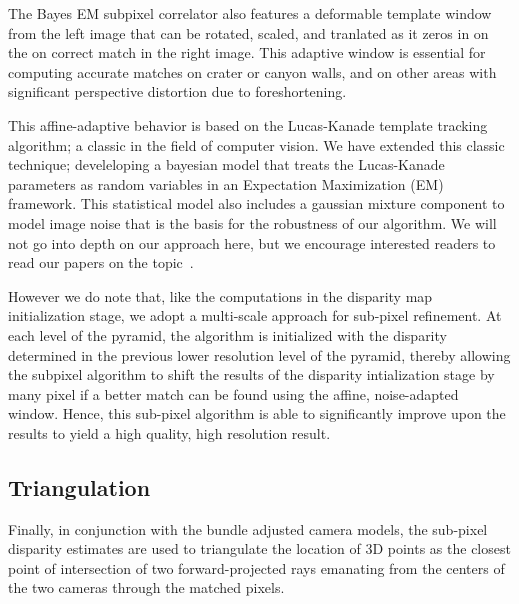 The Bayes EM subpixel correlator also features a deformable template
window from the left image that can be rotated, scaled, and tranlated
as it zeros in on the on correct match in the right image.  This
adaptive window is essential for computing accurate matches on crater
or canyon walls, and on other areas with significant perspective
distortion due to foreshortening.  

This affine-adaptive behavior is based on the Lucas-Kanade template
tracking algorithm; a classic in the field of computer vision.  We
have extended this classic technique; develeloping a bayesian model
that treats the Lucas-Kanade parameters as random variables in an
Expectation Maximization (EM) framework.  This statistical model also
includes a gaussian mixture component to model image noise that is the
basis for the robustness of our algorithm.  We will not go into depth
on our approach here, but we encourage interested readers to read our
papers on the topic~\cite{nefian:bayes_em, broxton:isvc09}.

However we do note that, like the computations in the disparity map
initialization stage, we adopt a multi-scale approach for sub-pixel
refinement. At each level of the pyramid, the algorithm is initialized
with the disparity determined in the previous lower resolution level
of the pyramid, thereby allowing the subpixel algorithm to shift the
results of the disparity intialization stage by many pixel if a better
match can be found using the affine, noise-adapted window.  Hence,
this sub-pixel algorithm is able to significantly improve upon the
results to yield a high quality, high resolution result.

\subsection{Triangulation}

Finally, in conjunction with the bundle adjusted camera models, the
sub-pixel disparity estimates are used to triangulate the location of
3D points as the closest point of intersection of two
forward-projected rays emanating from the centers of the two cameras
through the matched pixels.

